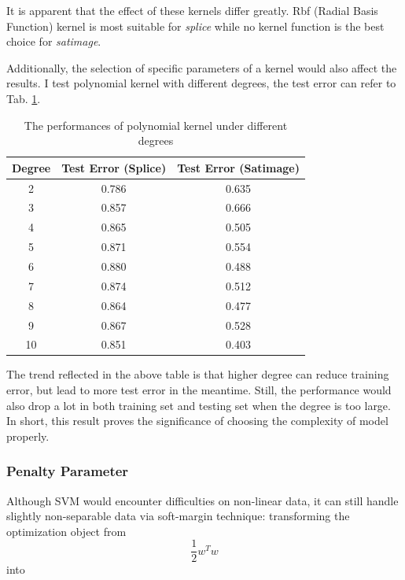 \documentclass[12pt,a4paper]{article}
\theoremstyle{definition}
\begin{document}
\vspace{0.015\linewidth}
It is apparent that the effect of these kernels differ greatly. Rbf (Radial Basis Function) kernel is most suitable for \textit{splice} while no kernel function is the best choice for \textit{satimage}. 

\vspace{0.015\linewidth}
Additionally, the selection of specific parameters of a kernel would also affect the results. I test polynomial kernel with different degrees, the test error can refer to Tab. \ref{tab:kernel-poly}.

\vspace{0.015\linewidth}
\begin{table}[H]
	\renewcommand\arraystretch{1.35}
	\caption{The performances of polynomial kernel under different degrees}
	\label{tab:kernel-poly}
	\centering
	
	\begin{tabular}{c|c|c}
		\centering
		Degree & Test Error (Splice) & Test Error (Satimage) \\
		\hline
		
		2 & 0.786 & 0.635 \\
		3 & 0.857 & 0.666 \\
		4 & 0.865 & 0.505 \\
		5 & 0.871 & 0.554 \\
		6 & 0.880 & 0.488 \\
		7 & 0.874 & 0.512 \\
		8 & 0.864 & 0.477 \\
		9 & 0.867 & 0.528 \\
		10 & 0.851 & 0.403 \\
	\end{tabular}
\end{table}

The trend reflected in the above table is that higher degree can reduce training error, but lead to more test error in the meantime. Still, the performance would also drop a lot in both training set and testing set when the degree is too large. In short, this result proves the significance of choosing the complexity of model properly.

\vspace{0.01\linewidth}
\subsubsection{Penalty Parameter}

Although SVM would encounter difficulties on non-linear data, it can still handle slightly non-separable data via soft-margin technique: transforming the optimization object from 
\begin{equation*}
\dfrac{1}{2}w^Tw
\end{equation*}
into
\end{document}

